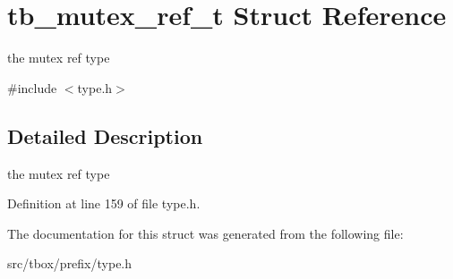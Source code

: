 \hypertarget{structtb__mutex__ref__t}{\section{tb\-\_\-mutex\-\_\-ref\-\_\-t Struct Reference}
\label{structtb__mutex__ref__t}
}


the mutex ref type  




{\ttfamily \#include $<$type.\-h$>$}



\subsection{Detailed Description}
the mutex ref type 

Definition at line 159 of file type.\-h.



The documentation for this struct was generated from the following file\-:\begin{DoxyCompactItemize}
\item 
src/tbox/prefix/type.\-h\end{DoxyCompactItemize}
